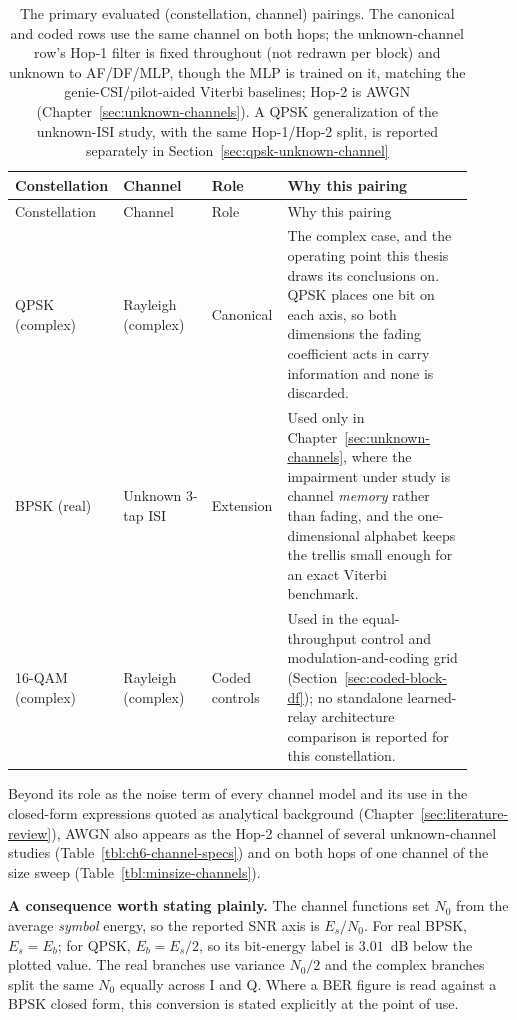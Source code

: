 \begin{longtable}[]{@{}p{0.18\linewidth}p{0.19\linewidth}p{0.14\linewidth}p{0.40\linewidth}@{}}
\caption[The evaluated configurations]{The primary evaluated (constellation, channel) pairings. The canonical and coded rows use the same channel on both hops; the unknown-channel row's Hop-1 filter is fixed throughout (not redrawn per block) and unknown to AF/DF/MLP, though the MLP is trained on it, matching the genie-CSI/pilot-aided Viterbi baselines; Hop-2 is AWGN (Chapter~\ref{sec:unknown-channels}). A QPSK generalization of the unknown-ISI study, with the same Hop-1/Hop-2 split, is reported separately in Section~\ref{sec:qpsk-unknown-channel}}\label{tbl:configurations}\tabularnewline
\toprule\noalign{}
Constellation & Channel & Role & Why this pairing \\
\midrule\noalign{}
\endfirsthead
\toprule\noalign{}
Constellation & Channel & Role & Why this pairing \\
\midrule\noalign{}
\endhead
\bottomrule\noalign{}
\endlastfoot
QPSK (complex) & Rayleigh (complex) & Canonical & The complex case, and the operating point this thesis draws its conclusions on. QPSK places one bit on each axis, so both dimensions the fading coefficient acts in carry information and none is discarded. \\
BPSK (real) & Unknown 3-tap ISI & Extension & Used only in Chapter~\ref{sec:unknown-channels}, where the impairment under study is channel \emph{memory} rather than fading, and the one-dimensional alphabet keeps the trellis small enough for an exact Viterbi benchmark. \\
16-QAM (complex) & Rayleigh (complex) & Coded controls & Used in the equal-throughput control and modulation-and-coding grid (Section~\ref{sec:coded-block-df}); no standalone learned-relay architecture comparison is reported for this constellation. \\
\end{longtable}

Beyond its role as the noise term of every channel model and its use in the closed-form expressions quoted as analytical background (Chapter~\ref{sec:literature-review}), AWGN also appears as the Hop-2 channel of several unknown-channel studies (Table~\ref{tbl:ch6-channel-specs}) and on both hops of one channel of the size sweep (Table~\ref{tbl:minsize-channels}).

\textbf{A consequence worth stating plainly.} The channel functions set \(N_0\) from the average \emph{symbol} energy, so the reported SNR axis is \(E_s/N_0\). For real BPSK, \(E_s=E_b\); for QPSK, \(E_b=E_s/2\), so its bit-energy label is \(3.01\)~dB below the plotted value. The real branches use variance \(N_0/2\) and the complex branches split the same \(N_0\) equally across I and Q. Where a BER figure is read against a BPSK closed form, this conversion is stated explicitly at the point of use.

